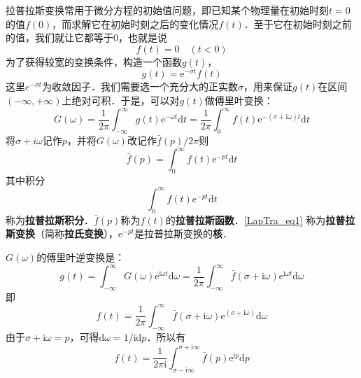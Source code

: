 
拉普拉斯变换常用于微分方程的初始值问题，即已知某个物理量在初始时刻$t=0$的值$f(0)$，而求解它在初始时刻之后的变化情况$f(t)$．至于它在初始时刻之前的值，我们就让它都等于$0$，也就是说
\begin{equation}
f(t)=0 \quad(t<0)
\end{equation}
为了获得较宽的变换条件，构造一个函数$g(t)$，
\begin{equation}
g(t)=\mathrm{e}^{-\sigma t} f(t)
\end{equation}
这里$e^{-\sigma t}$为收敛因子．我们需要选一个充分大的正实数$\sigma$，用来保证$g(t) $在区间$(-\infty,+\infty)$上绝对可积．于是，可以对$g(t) $做傅里叶变换：
\begin{equation}
G(\omega)=\frac{1}{2 \pi} \int_{-\infty}^{\infty} g(t) \mathrm{e}^{-\omega t} \mathrm{d} t=\frac{1}{2 \pi} \int_{0}^{\infty} f(t) \mathrm{e}^{-(\sigma+\mathrm{i} \omega) t} \mathrm{d} t
\end{equation}
将$\sigma+i \omega$记作$p$，并将$G(\omega)$改记作$\bar f(p) / 2 \pi$则
\begin{equation} \label{LapTra_eq1}
\bar{f}(p)=\int_{0}^{\infty} f(t) \mathrm{e}^{-p t} \mathrm{d} t
\end{equation}
其中积分
\begin{equation}
\int_{0}^{\infty} f(t) \mathrm{e}^{-p t} \mathrm{d} t
\end{equation}
称为\textbf{拉普拉斯积分}．$\bar f(p)$称为$f(t)$的\textbf{拉普拉斯函数}．\autoref{LapTra_eq1} 称为\textbf{拉普拉斯变换}（简称\textbf{拉氏变换}），$\mathrm e^{-pt}$是拉普拉斯变换的\textbf{核}．

$G(\omega)$的傅里叶逆变换是：
\begin{equation}
g(t)=\int_{-\infty}^{\infty} G(\omega) \mathrm{e}^{\mathrm{i} \omega t} \mathrm{d} \omega=\frac{1}{2 \pi} \int_{-\infty}^{\infty} \bar{f}(\sigma+\mathrm{i} \omega) \mathrm{e}^{\mathrm{i} \omega t} \mathrm{d} \omega
\end{equation}
即
\begin{equation}
f(t)=\frac{1}{2 \pi} \int_{-\infty}^{\infty} \bar{f}(\sigma+\mathrm{i} \omega) \mathrm{e}^{(\sigma+\mathrm{i} \omega)} \mathrm{d} \omega
\end{equation}
由于$\sigma+\mathrm i\omega=p$，可得$\mathrm d\omega = 1/\mathrm i\mathrm dp$．所以有
\begin{equation}
f(t)=\frac{1}{2 \pi \mathrm{i}} \int_{\sigma-\mathrm{i} \infty}^{\sigma+\mathrm{i} \infty} \bar{f}(p) \mathrm{e}^{\mathrm{i} p} \mathrm{d} p
\end{equation}

